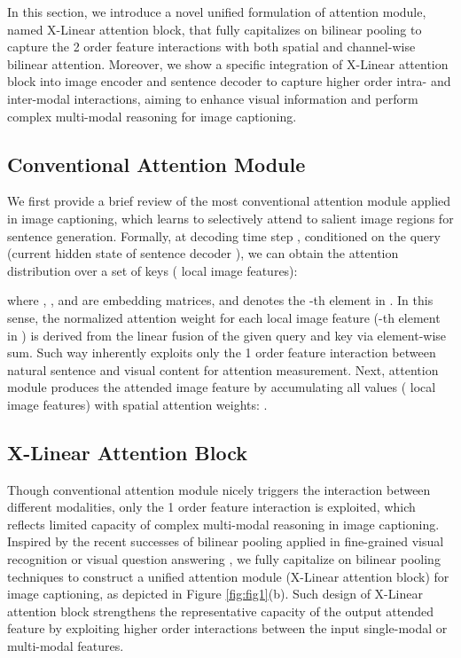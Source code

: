 \documentclass[10pt,twocolumn,letterpaper]{article}
\begin{document}
In this section, we introduce a novel unified formulation of attention module, named X-Linear attention block, that fully capitalizes on bilinear pooling to capture the 2 order feature interactions with both spatial and channel-wise bilinear attention. Moreover, we show a specific integration of X-Linear attention block into image encoder and sentence decoder to capture higher order intra- and inter-modal interactions, aiming to enhance visual information and perform complex multi-modal reasoning for image captioning.

\subsection{Conventional Attention Module}
We first provide a brief review of the most conventional attention module \cite{Xu:ICML15} applied in image captioning, which learns to selectively attend to salient image regions for sentence generation. Formally, at decoding time step , conditioned on the query  (current hidden state of sentence decoder ), we can obtain the attention distribution  over a set of keys  ( local image features):

where , , and  are embedding matrices, and  denotes the -th element in .
In this sense, the normalized attention weight  for each local image feature (-th element in ) is derived from the linear fusion of the given query and key via element-wise sum. Such way inherently exploits only the 1 order feature interaction between natural sentence and visual content for attention measurement. Next, attention module produces the attended image feature  by accumulating all values  ( local image features) with spatial attention weights: .



\subsection{X-Linear Attention Block}
Though conventional attention module nicely triggers the interaction between different modalities, only the 1 order feature interaction is exploited, which reflects limited capacity of complex multi-modal reasoning in image captioning.
Inspired by the recent successes of bilinear pooling applied in fine-grained visual recognition \cite{gao2016compact,yu2018hierarchical} or visual question answering \cite{fukui2016multimodal,kim2018bilinear}, we fully capitalize on bilinear pooling techniques to construct a unified attention module (X-Linear attention block) for image captioning, as depicted in Figure \ref{fig:fig1}(b). Such design of X-Linear attention block strengthens the representative capacity of the output attended feature by exploiting higher order interactions between the input single-modal or multi-modal features.
\end{document}
